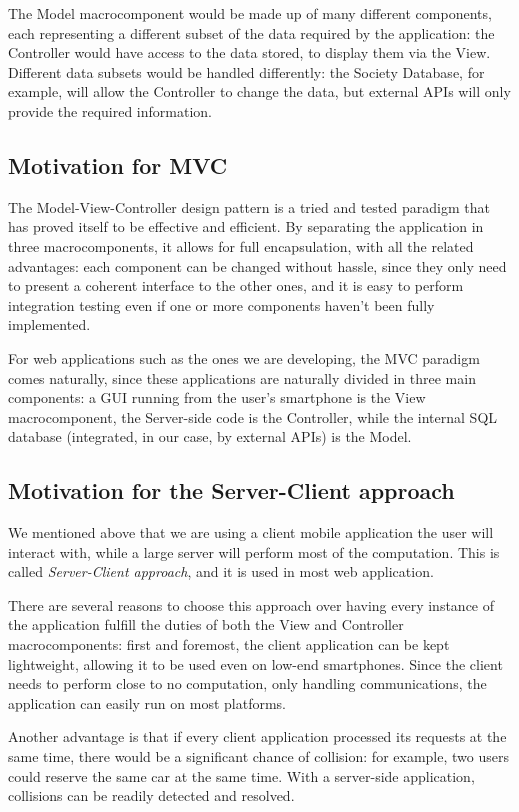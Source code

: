 \documentclass[12pt]{article}
\begin{document}
The Model macrocomponent would be made up of many different components, each representing a different subset of the data required by the application: the Controller would have access to the data stored, to display them via the View. Different data subsets would be handled differently: the Society Database, for example, will allow the Controller to change the data, but external APIs will only provide the required information.

\subsection{Motivation for MVC}
The Model-View-Controller design pattern is a tried and tested paradigm that has proved itself to be effective and efficient. By separating the application in three macrocomponents, it allows for full encapsulation, with all the related advantages: each component can be changed without hassle, since they only need to present a coherent interface to the other ones, and it is easy to perform integration testing even if one or more components haven't been fully implemented.

For web applications such as the ones we are developing, the MVC paradigm comes naturally, since these applications are naturally divided in three main components: a GUI running from the user's smartphone is the View macrocomponent, the Server-side code is the Controller, while the internal SQL database (integrated, in our case, by external APIs) is the Model.

\subsection{Motivation for the Server-Client approach}
We mentioned above that we are using a client mobile application the user will interact with, while a large server will perform most of the computation. This is called \emph{Server-Client approach}, and it is used in most web application.

There are several reasons to choose this approach over having every instance of the application fulfill the duties of both the View and Controller macrocomponents: first and foremost, the client application can be kept lightweight, allowing it to be used even on low-end smartphones. Since the client needs to perform close to no computation, only handling communications, the application can easily run on most platforms.

Another advantage is that if every client application processed its requests at the same time, there would be a significant chance of collision: for example, two users could reserve the same car at the same time. With a server-side application, collisions can be readily detected and resolved.
\end{document}
